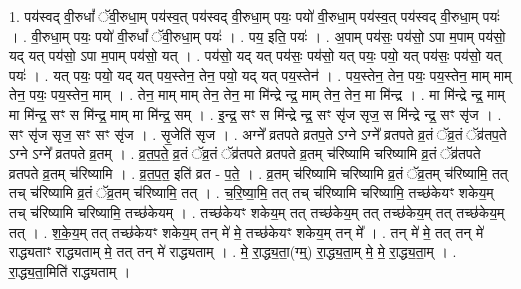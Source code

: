 \documentclass[17pt]{extarticle}
\begin{document}
1. पय॑स्वद् वी॒रुधां᳚ ॅवी॒रुधा॒म् पय॑स्व॒त् पय॑स्वद् वी॒रुधा॒म् पयः॒ पयो॑ वी॒रुधा॒म् पय॑स्व॒त् पय॑स्वद् वी॒रुधा॒म् पयः॑ । . वी॒रुधा॒म् पयः॒ पयो॑ वी॒रुधां᳚ ॅवी॒रुधा॒म् पयः॑ । . पय॒ इति॒ पयः॑ । . अ॒पाम् पय॑सः॒ पय॑सो॒ ऽपा म॒पाम् पय॑सो॒ यद् यत् पय॑सो॒ ऽपा म॒पाम् पय॑सो॒ यत् । . पय॑सो॒ यद् यत् पय॑सः॒ पय॑सो॒ यत् पयः॒ पयो॒ यत् पय॑सः॒ पय॑सो॒ यत् पयः॑ । . यत् पयः॒ पयो॒ यद् यत् पय॒स्तेन॒ तेन॒ पयो॒ यद् यत् पय॒स्तेन॑ । . पय॒स्तेन॒ तेन॒ पयः॒ पय॒स्तेन॒ माम् माम् तेन॒ पयः॒ पय॒स्तेन॒ माम् । . तेन॒ माम् माम् तेन॒ तेन॒ मा मि॑न्द्रे न्द्र॒ माम् तेन॒ तेन॒ मा मि॑न्द्र । . मा मि॑न्द्रे न्द्र॒ माम् मा मि॑न्द्र॒ सꣳ स मि॑न्द्र॒ माम् मा मि॑न्द्र॒ सम् । . इ॒न्द्र॒ सꣳ स मि॑न्द्रे न्द्र॒ सꣳ सृ॑ज सृज॒ स मि॑न्द्रे न्द्र॒ सꣳ सृ॑ज । . सꣳ सृ॑ज सृज॒ सꣳ सꣳ सृ॑ज । . सृ॒जेति॑ सृज । . अग्ने᳚ व्रतपते व्रतप॒ते ऽग्ने ऽग्ने᳚ व्रतपते व्र॒तं ॅव्र॒तं ॅव्र॑तप॒ते ऽग्ने ऽग्ने᳚ व्रतपते व्र॒तम् । . व्र॒त॒प॒ते॒ व्र॒तं ॅव्र॒तं ॅव्र॑तपते व्रतपते व्र॒तम् च॑रिष्यामि चरिष्यामि व्र॒तं ॅव्र॑तपते व्रतपते व्र॒तम् च॑रिष्यामि । . व्र॒त॒प॒त॒ इति॑ व्रत - प॒ते॒ । . व्र॒तम् च॑रिष्यामि चरिष्यामि व्र॒तं ॅव्र॒तम् च॑रिष्यामि॒ तत् तच् च॑रिष्यामि व्र॒तं ॅव्र॒तम् च॑रिष्यामि॒ तत् । . च॒रि॒ष्या॒मि॒ तत् तच् च॑रिष्यामि चरिष्यामि॒ तच्छ॑केयꣳ शकेय॒म् तच् च॑रिष्यामि चरिष्यामि॒ तच्छ॑केयम् । . तच्छ॑केयꣳ शकेय॒म् तत् तच्छ॑केय॒म् तत् तच्छ॑केय॒म् तत् तच्छ॑केय॒म् तत् । . श॒के॒य॒म् तत् तच्छ॑केयꣳ शकेय॒म् तन् मे॑ मे॒ तच्छ॑केयꣳ शकेय॒म् तन् मे᳚ । . तन् मे॑ मे॒ तत् तन् मे॑ राद्ध्यताꣳ राद्ध्यताम् मे॒ तत् तन् मे॑ राद्ध्यताम् । . मे॒ रा॒द्ध्य॒ता॒(ग्म्॒) रा॒द्ध्य॒ता॒म् मे॒ मे॒ रा॒द्ध्य॒ता॒म् । . रा॒द्ध्य॒ता॒मिति॑ राद्ध्यताम् । \newline
\end{document}
